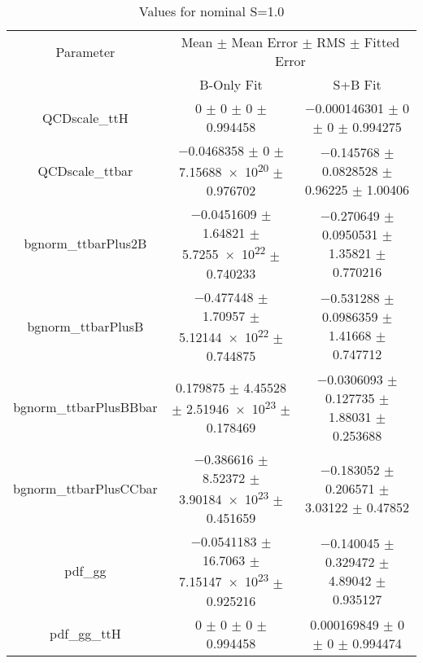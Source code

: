 \begin{table}
\centering
\caption{Values for nominal S=1.0}
\begin{tabular}{ccc}
\toprule
Parameter & \multicolumn{2}{c}{Mean $\pm$ Mean Error $\pm$ RMS $\pm$ Fitted Error}\\
 & B-Only Fit & S+B Fit\\
\midrule
QCDscale\_ttH & \num{0} $\pm$ \num{0} $\pm$ \num{0} $\pm$ \num{0.994458} & \num{-0.000146301} $\pm$ \num{0} $\pm$ \num{0} $\pm$ \num{0.994275}\\
QCDscale\_ttbar & \num{-0.0468358} $\pm$ \num{0} $\pm$ \num{7.15688e+20} $\pm$ \num{0.976702} & \num{-0.145768} $\pm$ \num{0.0828528} $\pm$ \num{0.96225} $\pm$ \num{1.00406}\\
bgnorm\_ttbarPlus2B & \num{-0.0451609} $\pm$ \num{1.64821} $\pm$ \num{5.7255e+22} $\pm$ \num{0.740233} & \num{-0.270649} $\pm$ \num{0.0950531} $\pm$ \num{1.35821} $\pm$ \num{0.770216}\\
bgnorm\_ttbarPlusB & \num{-0.477448} $\pm$ \num{1.70957} $\pm$ \num{5.12144e+22} $\pm$ \num{0.744875} & \num{-0.531288} $\pm$ \num{0.0986359} $\pm$ \num{1.41668} $\pm$ \num{0.747712}\\
bgnorm\_ttbarPlusBBbar & \num{0.179875} $\pm$ \num{4.45528} $\pm$ \num{2.51946e+23} $\pm$ \num{0.178469} & \num{-0.0306093} $\pm$ \num{0.127735} $\pm$ \num{1.88031} $\pm$ \num{0.253688}\\
bgnorm\_ttbarPlusCCbar & \num{-0.386616} $\pm$ \num{8.52372} $\pm$ \num{3.90184e+23} $\pm$ \num{0.451659} & \num{-0.183052} $\pm$ \num{0.206571} $\pm$ \num{3.03122} $\pm$ \num{0.47852}\\
pdf\_gg & \num{-0.0541183} $\pm$ \num{16.7063} $\pm$ \num{7.15147e+23} $\pm$ \num{0.925216} & \num{-0.140045} $\pm$ \num{0.329472} $\pm$ \num{4.89042} $\pm$ \num{0.935127}\\
pdf\_gg\_ttH & \num{0} $\pm$ \num{0} $\pm$ \num{0} $\pm$ \num{0.994458} & \num{0.000169849} $\pm$ \num{0} $\pm$ \num{0} $\pm$ \num{0.994474}\\
\bottomrule
\end{tabular}
\end{table}